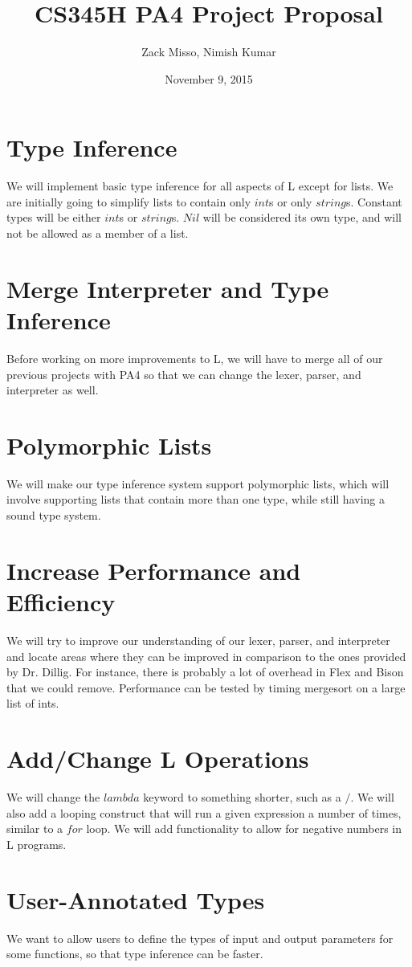 \documentclass{article}
\title{CS345H PA4 Project Proposal}
\author{Zack Misso, Nimish Kumar}
\date{November 9, 2015}
\begin{document}
\maketitle

\section{Type Inference}
We will implement basic type inference for all aspects of L except for lists. We are initially going to simplify lists to contain only \(int\)s or only \(string\)s. Constant types will be either \(int\)s or \(string\)s. \(Nil\) will be considered its own type, and will not be allowed as a member of a list.

\section{Merge Interpreter and Type Inference}
Before working on more improvements to L, we will have to merge all of our previous projects with PA4 so that we can change the lexer, parser, and interpreter as well.

\section{Polymorphic Lists}
We will make our type inference system support polymorphic lists, which will involve supporting lists that contain more than one type, while still having a sound type system.

\section{Increase Performance and Efficiency}
We will try to improve our understanding of our lexer, parser, and interpreter and locate areas where they can be improved in comparison to the ones provided by Dr. Dillig. For instance, there is probably a lot of overhead in Flex and Bison that we could remove. Performance can be tested by timing mergesort on a large list of ints.

\section{Add/Change L Operations}
We will change the \(lambda\) keyword to something shorter, such as a \(/\). We will also add a looping construct that will run a given expression a number of times, similar to a \(for\) loop. We will add functionality to allow for negative numbers in L programs.

\section{User-Annotated Types}
We want to allow users to define the types of input and output parameters for some functions, so that type inference can be faster.
\end{document}
